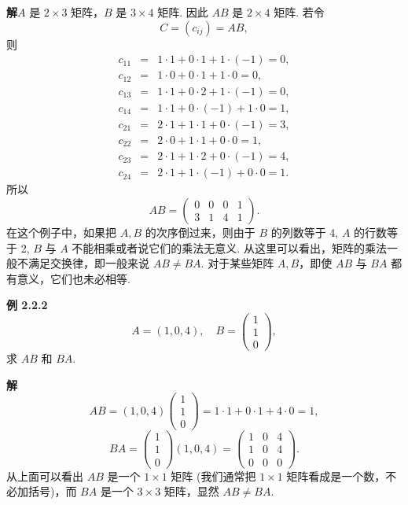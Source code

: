 \documentclass[UTF8,12pt,a4paper,fontset=fandol]{ctexart}
\begin{document}
\noindent\textbf{解}\quad $A$ 是 $2\times 3$ 矩阵，$B$ 是 $3\times 4$ 矩阵. 因此 $AB$ 是 $2\times 4$ 矩阵. 若令
\[
C=(c_{ij})=AB,
\]
则
\[
\begin{array}{rcl}
c_{11}&=&1\cdot 1+0\cdot 1+1\cdot(-1)=0,\\
c_{12}&=&1\cdot 0+0\cdot 1+1\cdot 0=0,\\
c_{13}&=&1\cdot 1+0\cdot 2+1\cdot(-1)=0,\\
c_{14}&=&1\cdot 1+0\cdot(-1)+1\cdot 0=1,\\
c_{21}&=&2\cdot 1+1\cdot 1+0\cdot(-1)=3,\\
c_{22}&=&2\cdot 0+1\cdot 1+0\cdot 0=1,\\
c_{23}&=&2\cdot 1+1\cdot 2+0\cdot(-1)=4,\\
c_{24}&=&2\cdot 1+1\cdot(-1)+0\cdot 0=1.
\end{array}
\]
所以
\[
AB=\left(\begin{array}{cccc}
0 & 0 & 0 & 1\\
3 & 1 & 4 & 1
\end{array}\right).
\]
在这个例子中，如果把 $A,B$ 的次序倒过来，则由于 $B$ 的列数等于 4, $A$ 的行数等于 2, $B$ 与 $A$ 不能相乘或者说它们的乘法无意义. 从这里可以看出，矩阵的乘法一般不满足交换律，即一般来说 $AB\ne BA$. 对于某些矩阵 $A,B$，即使 $AB$ 与 $BA$ 都有意义，它们也未必相等.

\noindent\textbf{例 2.2.2}\quad
\[
A=(1,0,4),\quad
B=\left(\begin{array}{c}
1\\
1\\
0
\end{array}\right),
\]
求 $AB$ 和 $BA$.

\noindent\textbf{解}\quad
\[
AB=(1,0,4)\left(\begin{array}{c}
1\\
1\\
0
\end{array}\right)=1\cdot 1+0\cdot 1+4\cdot 0=1,
\]
\[
BA=\left(\begin{array}{c}
1\\
1\\
0
\end{array}\right)(1,0,4)=
\left(\begin{array}{ccc}
1 & 0 & 4\\
1 & 0 & 4\\
0 & 0 & 0
\end{array}\right).
\]
从上面可以看出 $AB$ 是一个 $1\times 1$ 矩阵 (我们通常把 $1\times 1$ 矩阵看成是一个数，不必加括号)，而 $BA$ 是一个 $3\times 3$ 矩阵，显然 $AB\ne BA$.
\end{document}
